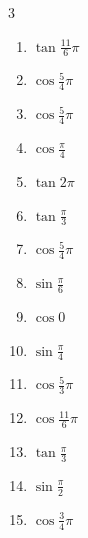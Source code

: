\begin{multicols}{3}
\begin{enumerate}
  \item $\displaystyle \tan{\frac{11}{6}\pi}$

  \item $\displaystyle \cos{\frac{5}{4}\pi}$

  \item $\displaystyle \cos{\frac{5}{4}\pi}$

  \item $\displaystyle \cos{\frac{\pi}{4}}$

  \item $\displaystyle \tan{2\pi}$
        \phantom{$\displaystyle =0$}

  \item $\displaystyle \tan{\frac{\pi}{3}}$

  \item $\displaystyle \cos{\frac{5}{4}\pi}$

  \item $\displaystyle \sin{\frac{\pi}{6}}$

  \item $\displaystyle \cos{0}$
        \phantom{$\displaystyle =1$}

  \item $\displaystyle \sin{\frac{\pi}{4}}$

  \item $\displaystyle \cos{\frac{5}{3}\pi}$

  \item $\displaystyle \cos{\frac{11}{6}\pi}$

  \item $\displaystyle \tan{\frac{\pi}{3}}$

  \item $\displaystyle \sin{\frac{\pi}{2}}$
        \phantom{$\displaystyle =1$}

  \item $\displaystyle \cos{\frac{3}{4}\pi}$

\columnbreak %


\end{enumerate}
\end{multicols}
